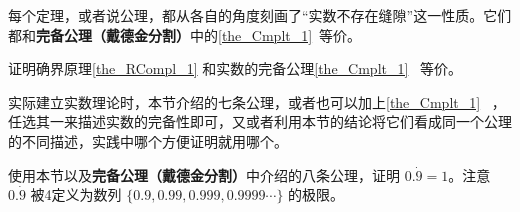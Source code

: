 每个定理，或者说公理，都从各自的角度刻画了“实数不存在缝隙”这一性质。它们都和\textbf{完备公理（戴德金分割）}中的\autoref{the_Cmplt_1}~等价。

\begin{exercise}{}
证明确界原理\autoref{the_RCompl_1} 和实数的完备公理\autoref{the_Cmplt_1}~ 等价。
\end{exercise}

实际建立实数理论时，本节介绍的七条公理，或者也可以加上\autoref{the_Cmplt_1}~ ，任选其一来描述实数的完备性即可，又或者利用本节的结论将它们看成同一个公理的不同描述，实践中哪个方便证明就用哪个。

\begin{exercise}{}
使用本节以及\textbf{完备公理（戴德金分割）}中介绍的八条公理，证明 $0.\dot{9}=1$。注意 $0.\dot{9}$ 被4定义为数列 $\{0.9, 0.99, 0.999, 0.9999\cdots\}$ 的极限。
\end{exercise}













